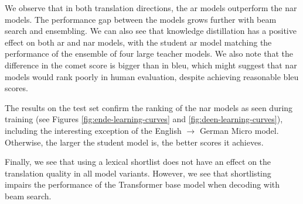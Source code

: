 We observe that in both translation directions, the \ac{ar} models outperform
the \ac{nar} models. The performance gap between the models grows further with
beam search and ensembling. We can also see that knowledge distillation has a
positive effect on both \ac{ar} and \ac{nar} models, with the student \ac{ar}
model matching the performance of the ensemble of four large teacher models.
We also note that the difference in the \acs{comet} score is bigger than in
\acs{bleu}, which might suggest that \acs{nar} models would rank poorly in
human evaluation, despite achieving reasonable \acs{bleu} scores.

The results on the test set confirm the ranking of the \acs{nar} models as seen
during training (see Figures \ref{fig:ende-learning-curves} and
\ref{fig:deen-learning-curves}), including the interesting exception of the
English $\rightarrow$ German Micro model. Otherwise, the larger the student
model is, the better scores it achieves.

Finally, we see that using a lexical shortlist does not have an effect on the
translation quality in all model variants. However, we see that shortlisting
impairs the performance of the Transformer base model when decoding with beam
search.

